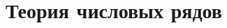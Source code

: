\documentclass[12pt, oneside]{book}
\theoremstyle{plain}
\begin{document}
	\tableofcontents
	\chapter{Теория числовых рядов}
	
	
	
\end{document}
